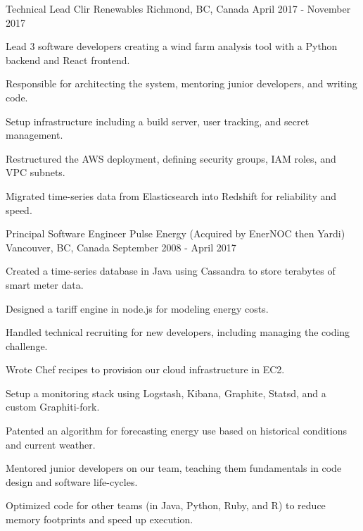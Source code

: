 \begin{cventries}

  \cventry
    {Technical Lead} %
    {Clir Renewables} %
    {Richmond, BC, Canada} %
    {April 2017 - November 2017} %
    {
      \begin{cvitems} %
        \item {Lead 3 software developers creating a wind farm analysis tool with a Python backend and React frontend.}
        \item {Responsible for architecting the system, mentoring junior developers, and writing code.}
        \item {Setup infrastructure including a build server, user tracking, and secret management.}
        \item {Restructured the AWS deployment, defining security groups, IAM roles, and VPC subnets.}
        \item {Migrated time-series data from Elasticsearch into Redshift for reliability and speed.}
      \end{cvitems}
    }


  \cventry
    {Principal Software Engineer} %
    {Pulse Energy (Acquired by EnerNOC then Yardi)} %
    {Vancouver, BC, Canada} %
    {September 2008 - April 2017} %
    {
      \begin{cvitems} %
        \item {Created a time-series database in Java using Cassandra to store terabytes of smart meter data.}
        \item {Designed a tariff engine in node.js for modeling energy costs.}
        \item {Handled technical recruiting for new developers, including managing the coding challenge.}
        \item {Wrote Chef recipes to provision our cloud infrastructure in EC2.}
        \item {Setup a monitoring stack using Logstash, Kibana, Graphite, Statsd, and a custom Graphiti-fork.}
        \item {Patented an algorithm for forecasting energy use based on historical conditions and current weather.}
        \item {Mentored junior developers on our team, teaching them fundamentals in code design and software life-cycles.}
        \item {Optimized code for other teams (in Java, Python, Ruby, and R) to reduce memory footprints and speed up execution.}
      \end{cvitems}
    }


\end{cventries}
